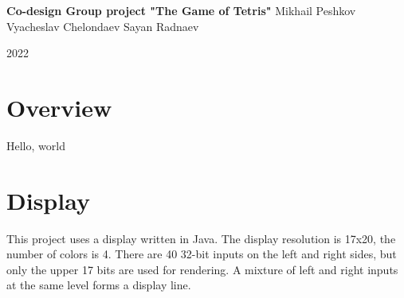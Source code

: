 \documentclass[12pt, a4paper, twoside]{article}
\begin{document}
\begin{titlepage}
    \begin{center}
        \Large{
            \textbf {
            Co-design Group project \linebreak
            "The Game of Tetris"
        }
        } 
        \vspace{}
        Mikhail Peshkov \linebreak
        Vyacheslav Chelondaev \linebreak
        Sayan Radnaev
    \end{center}
    \vspace{\fill}
    \begin{center}
        2022
    \end{center}
\end{titlepage}
\newpage
\setcounter{page}{1}
\section{Overview}
Hello, world

\section{Display}
This project uses a display written in Java. The display resolution is 17x20, the number of colors is 4. There are 40 32-bit inputs on the left and right sides, but only the upper 17 bits are used for rendering. A mixture of left and right inputs at the same level forms a display line.
\end{document}
